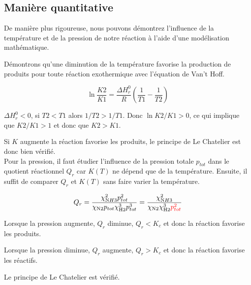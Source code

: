 \documentclass[10pt,a4paper]{article}
\begin{document}
\subsection{Manière quantitative}

De manière plus rigoureuse, nous pouvons démontrez l'influence de la température et de la pression de notre réaction à l'aide d'une modélisation mathématique.

Démontrons qu'une diminution de la température favorise la production de produits pour toute réaction exothermique avec l'équation de Van't Hoff.

$$\ln{\frac{K2}{K1}} = \frac{\Delta H^0_r}{R}(\frac{1}{T1} - \frac{1}{T2}) $$ 

$ \Delta H^0_r < 0$, si $T2<T1$ alors $1/T2 > 1/T1$. Donc $\ln{K2/K1} > 0$, ce qui implique que $K2/K1>1$  et donc que $ K2>K1$.

Si $K$ augmente la réaction favorise les produits, le principe de Le Chatelier est donc bien vérifié.
\\

Pour la pression, il faut étudier l'influence de la pression totale $p_{tot}$ dans le quotient réactionnel $Q_r$ car $K(T)$ ne dépend que de la température. Ensuite, il suffit de comparer $Q_r$ et  $K(T)$ sans faire varier la température. 

$$ Q_r= \frac{\chi_{\ce NH3}^2 p_{tot}^2}{\chi_{\ce N2} p_{tot} \chi_{\ce H2}^3 p_{tot}^3}=\frac{\chi_{\ce NH3}^2}{\chi_{\ce N2} \chi_{\ce H2}^3 \textcolor{red}{p_{tot}^2}}$$ 

Lorsque la pression augmente, $Q_r$ diminue, $Q_r < K_c$ et donc la réaction favorise les produits.
 
Lorsque la pression diminue, $Q_r$ augmente, $Q_r > K_c$ et donc la réaction favorise les réactifs.

Le principe de Le Chatelier est vérifié.
\end{document}

